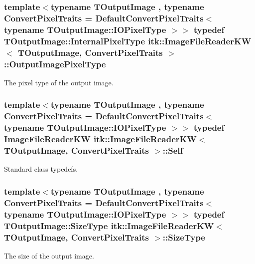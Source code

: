 \subsubsection[{\texorpdfstring{Output\+Image\+Pixel\+Type}{OutputImagePixelType}}]{\setlength{\rightskip}{0pt plus 5cm}template$<$typename T\+Output\+Image , typename Convert\+Pixel\+Traits  = Default\+Convert\+Pixel\+Traits$<$                    typename T\+Output\+Image\+::\+I\+O\+Pixel\+Type $>$$>$ typedef T\+Output\+Image\+::\+Internal\+Pixel\+Type {\bf itk\+::\+Image\+File\+Reader\+KW}$<$ T\+Output\+Image, Convert\+Pixel\+Traits $>$\+::{\bf Output\+Image\+Pixel\+Type}}\hypertarget{classitk_1_1_image_file_reader_k_w_a3bc68922731e94450245260bc9eced45}{}\label{classitk_1_1_image_file_reader_k_w_a3bc68922731e94450245260bc9eced45}
The pixel type of the output image. 
\subsubsection[{\texorpdfstring{Self}{Self}}]{\setlength{\rightskip}{0pt plus 5cm}template$<$typename T\+Output\+Image , typename Convert\+Pixel\+Traits  = Default\+Convert\+Pixel\+Traits$<$                    typename T\+Output\+Image\+::\+I\+O\+Pixel\+Type $>$$>$ typedef {\bf Image\+File\+Reader\+KW} {\bf itk\+::\+Image\+File\+Reader\+KW}$<$ T\+Output\+Image, Convert\+Pixel\+Traits $>$\+::{\bf Self}}\hypertarget{classitk_1_1_image_file_reader_k_w_a6616e1e0fe9f4aceb7f693250b5f5b5c}{}\label{classitk_1_1_image_file_reader_k_w_a6616e1e0fe9f4aceb7f693250b5f5b5c}
Standard class typedefs. 
\subsubsection[{\texorpdfstring{Size\+Type}{SizeType}}]{\setlength{\rightskip}{0pt plus 5cm}template$<$typename T\+Output\+Image , typename Convert\+Pixel\+Traits  = Default\+Convert\+Pixel\+Traits$<$                    typename T\+Output\+Image\+::\+I\+O\+Pixel\+Type $>$$>$ typedef T\+Output\+Image\+::\+Size\+Type {\bf itk\+::\+Image\+File\+Reader\+KW}$<$ T\+Output\+Image, Convert\+Pixel\+Traits $>$\+::{\bf Size\+Type}}\hypertarget{classitk_1_1_image_file_reader_k_w_a7a7f4acf918af20f820cdb57ab4ae18d}{}\label{classitk_1_1_image_file_reader_k_w_a7a7f4acf918af20f820cdb57ab4ae18d}
The size of the output image. 

